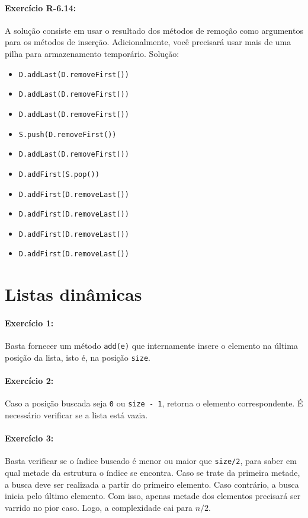 \paragraph{Exercício R-6.14:}
A solução consiste em usar o resultado dos métodos de remoção como argumentos para os métodos de inserção. Adicionalmente, você precisará usar mais de uma pilha para armazenamento temporário. Solução:
\begin{itemize}
	\item \texttt{D.addLast(D.removeFirst())}
	\item \texttt{D.addLast(D.removeFirst())}
	\item \texttt{D.addLast(D.removeFirst())}
	\item \texttt{S.push(D.removeFirst())}
	\item \texttt{D.addLast(D.removeFirst())}
	\item \texttt{D.addFirst(S.pop())}
	\item \texttt{D.addFirst(D.removeLast())}
	\item \texttt{D.addFirst(D.removeLast())}
	\item \texttt{D.addFirst(D.removeLast())}
	\item \texttt{D.addFirst(D.removeLast())}
\end{itemize}


\section{Listas dinâmicas}

\paragraph{Exercício 1:}
Basta fornecer um método \texttt{add(e)} que internamente insere o elemento na última posição da lista, isto é, na posição \texttt{size}.

\paragraph{Exercício 2:}
Caso a posição buscada seja \texttt{0} ou \texttt{size - 1}, retorna o elemento correspondente. É necessário verificar se a lista está vazia.

\paragraph{Exercício 3:}
Basta verificar se o índice buscado é menor ou maior que \texttt{size/2}, para saber em qual metade da estrutura o índice se encontra. Caso se trate da primeira metade, a busca deve ser realizada a partir do primeiro elemento. Caso contrário, a busca inicia pelo último elemento. Com isso, apenas metade dos elementos precisará ser varrido no pior caso. Logo, a complexidade cai para $n/2$.

